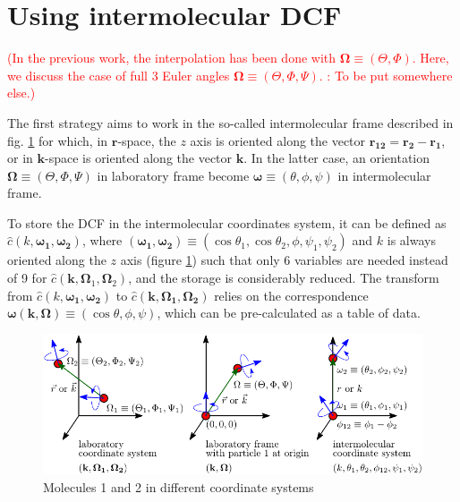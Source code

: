 \section{Using intermolecular DCF}

\textcolor{red}{(In the previous work, the interpolation has been
done with $\mathbf{\Omega}\equiv(\Theta,\Phi)$. Here, we discuss
the case of full 3 Euler angles $\mathbf{\Omega}\equiv(\Theta,\Phi,\Psi)$.
: To be put somewhere else.)}

The first strategy aims to work in the so-called intermolecular frame
described in fig. \ref{fig:coordinate_systems} for which, in $\mathbf{r}$-space,
the $z$ axis is oriented along the vector $\mathbf{r_{12}}=\mathbf{r_{2}}-\mathbf{r_{1}}$,
or in $\mathbf{k}$-space is oriented along the vector $\mathbf{k}$.
In the latter case, an orientation $\mathbf{\Omega}\equiv(\Theta,\Phi,\Psi)$
in laboratory frame become $\boldsymbol{\omega}\equiv(\theta,\phi,\psi)$
in intermolecular frame. 

To store the DCF in the intermolecular coordinates system, it can
be defined as $\hat{c}(k,\boldsymbol{\omega_{1}},\boldsymbol{\omega_{2}})$,
where $(\boldsymbol{\omega_{1}},\boldsymbol{\omega_{2}})\equiv(\cos\theta_{1},\cos\theta_{2},\phi,\psi_{1},\psi_{2})$
and $k$ is always oriented along the $z$ axis (figure \ref{fig:coordinate_systems})
such that only 6 variables are needed instead of 9 for $\hat{c}(\mathbf{k},\mathbf{\Omega}_{1},\mathbf{\Omega}_{2})$,
and the storage is considerably reduced. The transform from $\hat{c}(k,\boldsymbol{\omega_{1}},\boldsymbol{\omega_{2}})$
to $\hat{c}(\mathbf{k},\mathbf{\Omega_{1}},\mathbf{\Omega_{2}})$
relies on the correspondence $\boldsymbol{\omega}(\mathbf{k},\mathbf{\Omega})\equiv(\cos\theta,\phi,\psi)$,
which can be pre-calculated as a table of data.

%
\begin{figure}[h]
\begin{centering}
\includegraphics{_figure/coordinate_system}
\par\end{centering}
\caption{\foreignlanguage{american}{Molecules 1 and 2 in different coordinate systems\foreignlanguage{english}{\label{fig:coordinate_systems}}}}
\end{figure}


